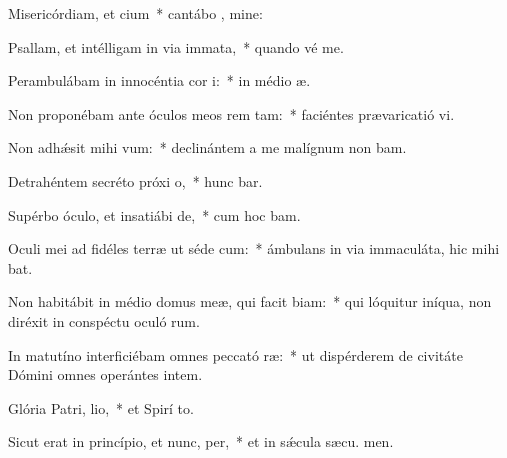 \item Misericórdiam, et cium~* cantábo , mine:
\item Psallam, et intélligam in via immata,~* quando vé  me.
\item Perambulábam in innocéntia cor i:~* in médio  æ.
\item Non proponébam ante óculos meos rem tam:~* faciéntes prævaricatió vi.
\item Non adhǽsit mihi  vum:~* declinántem a me malígnum non bam.
\item Detrahéntem secréto próxi o,~* hunc bar.
\item Supérbo óculo, et insatiábi de,~* cum hoc  bam.
\item Oculi mei ad fidéles terræ ut séde cum:~* ámbulans in via immaculáta, hic mihi bat.
\item Non habitábit in médio domus meæ, qui facit biam:~* qui lóquitur iníqua, non diréxit in conspéctu oculó rum.
\item In matutíno interficiébam omnes peccató ræ:~* ut dispérderem de civitáte Dómini omnes operántes intem.
\item Glória Patri,  lio,~* et Spirí to.
\item Sicut erat in princípio, et nunc,  per,~* et in sǽcula sæcu. men.
